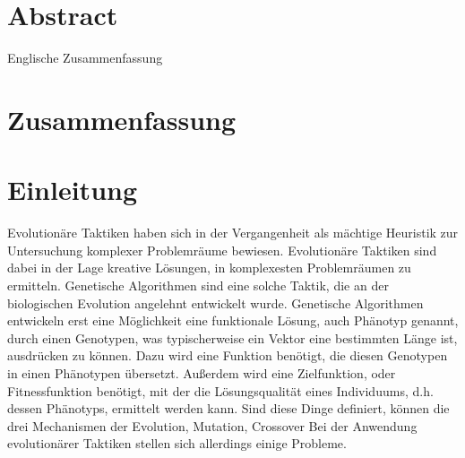 
\clearpage
\section*{Abstract}
Englische Zusammenfassung

\clearpage
\section*{Zusammenfassung}


\section{Einleitung}

Evolutionäre Taktiken haben sich in der Vergangenheit als mächtige Heuristik zur Untersuchung komplexer Problemräume bewiesen.
Evolutionäre Taktiken sind dabei in der Lage kreative Lösungen, in komplexesten Problemräumen zu ermitteln.
Genetische Algorithmen sind eine solche Taktik, die an der biologischen Evolution angelehnt entwickelt wurde.
Genetische Algorithmen entwickeln erst eine Möglichkeit eine funktionale Lösung, auch Phänotyp genannt, durch einen Genotypen, was typischerweise ein Vektor eine bestimmten Länge ist, ausdrücken zu können.
Dazu wird eine Funktion benötigt, die diesen Genotypen in einen Phänotypen übersetzt.
Außerdem wird eine Zielfunktion, oder Fitnessfunktion benötigt, mit der die Lösungsqualität eines Individuums, d.h. dessen Phänotyps, ermittelt werden kann.
Sind diese Dinge definiert, können die drei Mechanismen der Evolution, Mutation, Crossover
Bei der Anwendung evolutionärer Taktiken stellen sich allerdings einige Probleme.

